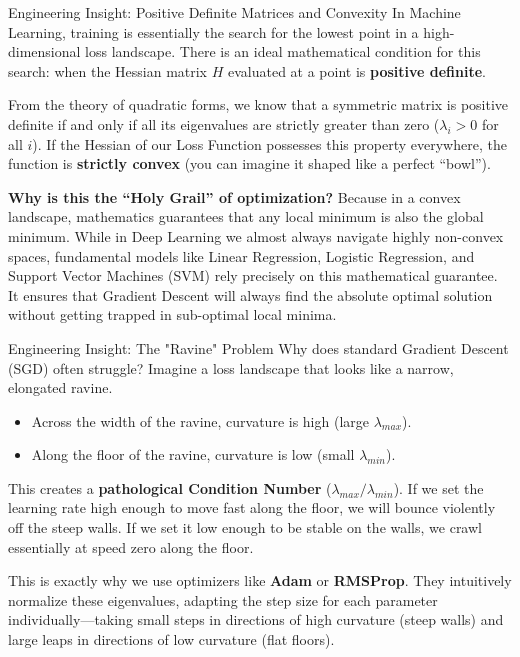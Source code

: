 \begin{unibobox}{Engineering Insight: Positive Definite Matrices and Convexity}
    In Machine Learning, training is essentially the search for the lowest point in a high-dimensional loss landscape. There is an ideal mathematical condition for this search: when the Hessian matrix $H$ evaluated at a point is \textbf{positive definite}.

From the theory of quadratic forms, we know that a symmetric matrix is positive definite if and only if all its eigenvalues are strictly greater than zero ($\lambda_i > 0$ for all $i$). If the Hessian of our Loss Function possesses this property everywhere, the function is \textbf{strictly convex} (you can imagine it shaped like a perfect ``bowl'').

\textbf{Why is this the ``Holy Grail'' of optimization?} Because in a convex landscape, mathematics guarantees that any local minimum is also the global minimum. While in Deep Learning we almost always navigate highly non-convex spaces, fundamental models like Linear Regression, Logistic Regression, and Support Vector Machines (SVM) rely precisely on this mathematical guarantee. It ensures that Gradient Descent will always find the absolute optimal solution without getting trapped in sub-optimal local minima.
\end{unibobox}


\begin{unibobox}{Engineering Insight: The "Ravine" Problem}
Why does standard Gradient Descent (SGD) often struggle?
Imagine a loss landscape that looks like a narrow, elongated ravine.
\begin{itemize}
    \item Across the width of the ravine, curvature is high (large $\lambda_{max}$).
    \item Along the floor of the ravine, curvature is low (small $\lambda_{min}$).
\end{itemize}

This creates a \textbf{pathological Condition Number} ($\lambda_{max} / \lambda_{min}$).
If we set the learning rate high enough to move fast along the floor, we will bounce violently off the steep walls. If we set it low enough to be stable on the walls, we crawl essentially at speed zero along the floor.

This is exactly why we use optimizers like \textbf{Adam} or \textbf{RMSProp}. They intuitively normalize these eigenvalues, adapting the step size for each parameter individually—taking small steps in directions of high curvature (steep walls) and large leaps in directions of low curvature (flat floors).
\end{unibobox}

